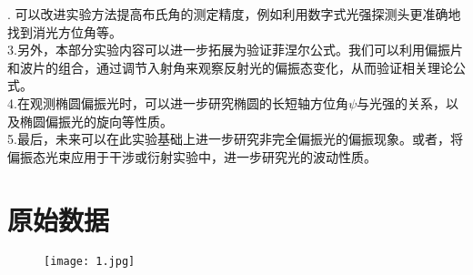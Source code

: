 \documentclass{ctexart}
\begin{document}
. 可以改进实验方法提高布氏角的测定精度，例如利用数字式光强探测头更准确地找到消光方位角等。\\
\noindent 3.另外，本部分实验内容可以进一步拓展为验证菲涅尔公式。我们可以利用偏振片和波片的组合，通过调节入射角来观察反射光的偏振态变化，从而验证相关理论公式。\\
\noindent 4.在观测椭圆偏振光时，可以进一步研究椭圆的长短轴方位角$\psi$与光强的关系，以及椭圆偏振光的旋向等性质。\\
\noindent 5.最后，未来可以在此实验基础上进一步研究非完全偏振光的偏振现象。或者，将偏振态光束应用于干涉或衍射实验中，进一步研究光的波动性质。




\clearpage
\section{原始数据}


\begin{figure}[htbp]
  \centering
  \texttt{[image: 1.jpg]}
\end{figure}
\end{document}
